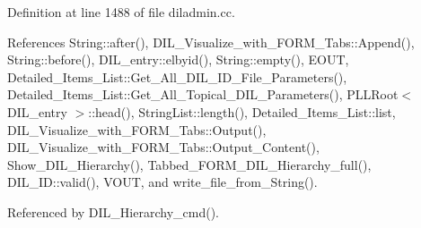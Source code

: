 Definition at line 1488 of file diladmin.cc.

References String::after(), DIL\_\-Visualize\_\-with\_\-FORM\_\-Tabs::Append(), String::before(), DIL\_\-entry::elbyid(), String::empty(), EOUT, Detailed\_\-Items\_\-List::Get\_\-All\_\-DIL\_\-ID\_\-File\_\-Parameters(), Detailed\_\-Items\_\-List::Get\_\-All\_\-Topical\_\-DIL\_\-Parameters(), PLLRoot$<$ DIL\_\-entry $>$::head(), String\-List::length(), Detailed\_\-Items\_\-List::list, DIL\_\-Visualize\_\-with\_\-FORM\_\-Tabs::Output(), DIL\_\-Visualize\_\-with\_\-FORM\_\-Tabs::Output\_\-Content(), Show\_\-DIL\_\-Hierarchy(), Tabbed\_\-FORM\_\-DIL\_\-Hierarchy\_\-full(), DIL\_\-ID::valid(), VOUT, and write\_\-file\_\-from\_\-String().

Referenced by DIL\_\-Hierarchy\_\-cmd().



